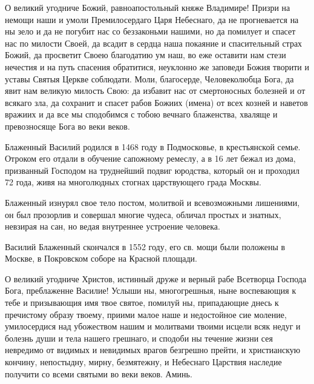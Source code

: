 \begin{mymulticols}

О великий угодниче Божий, равноапостольный княже Владимире! Призри на немощи наши и умоли Премилосердаго Царя Небеснаго, да не прогневается на ны зело и да не погубит нас со беззаконьми нашими, но да помилует и спасет нас по милости Своей, да всадит в сердца наша покаяние и спасительный страх Божий, да просветит Своею благодатию ум наш, во еже оставити нам стези нечестия и на путь спасения обратитися, неуклонно же заповеди Божия творити и уставы Святыя Церкве соблюдати. Моли, благосерде, Человеколюбца Бога, да явит нам великую милость Свою: да избавит нас от смертоносных болезней и от всякаго зла, да сохранит и спасет рабов Божиих (имена) от всех козней и наветов вражиих и да все мы сподобимся с тобою вечнаго блаженства, хваляще и превозносяще Бога во веки веков.


\end{mymulticols}

\mychapterending


\begin{mymulticols}

Блаженный Василий родился в 1468 году в Подмосковье, в крестьянской семье. Отроком его отдали в обучение сапожному ремеслу, а в 16 лет бежал из дома, призванный Господом на труднейший подвиг юродства, который он и проходил 72 года, живя на многолюдных стогнах царствующего града Москвы.


Блаженный изнурял свое тело постом, молитвой и всевозможными лишениями, он был прозорлив и совершал многие чудеса, обличал простых и знатных, невзирая на сан, но ведая внутреннее устроение человека.


Василий Блаженный скончался в 1552 году, его св. мощи были положены в Москве, в Покровском соборе на Красной площади.






О великий угодниче Христов, истинный друже и верный рабе Всетворца Господа Бога, преблаженне Василие! Услыши ны, многогрешныя, ныне воспевающия к тебе и призывающия имя твое святое, помилуй ны, припадающие днесь к пречистому образу твоему, приими малое наше и недостойное сие моление, умилосердися над убожеством нашим и молитвами твоими исцели всяк недуг и болезнь души и тела нашего грешнаго, и сподоби ны течение жизни сея невредимо от видимых и невидимых врагов безгрешно прейти, и христианскую кончину, непостыдну, мирну, безмятежну, и Небеснаго Царствия наследие получити со всеми святыми во веки веков. Аминь.


\end{mymulticols}

